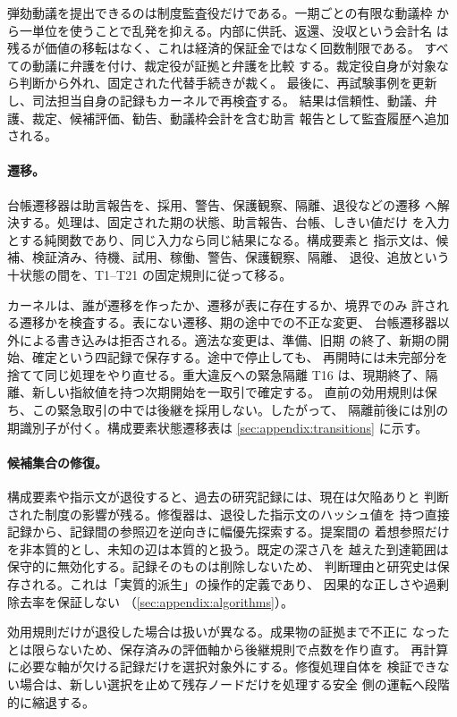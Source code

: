 弾劾動議を提出できるのは制度監査役だけである。一期ごとの有限な動議枠
から一単位を使うことで乱発を抑える。内部に供託、返還、没収という会計名
は残るが価値の移転はなく、これは経済的保証金ではなく回数制限である。
すべての動議に弁護を付け、裁定役が証拠と弁護を比較
する。裁定役自身が対象なら判断から外れ、固定された代替手続きが裁く。
最後に、再試験事例を更新し、司法担当自身の記録もカーネルで再検査する。
結果は信頼性、動議、弁護、裁定、候補評価、勧告、動議枠会計を含む助言
報告として監査履歴へ追加される。

\paragraph{遷移。}
台帳遷移器は助言報告を、採用、警告、保護観察、隔離、退役などの遷移
へ解決する。処理は、固定された期の状態、助言報告、台帳、しきい値だけ
を入力とする純関数であり、同じ入力なら同じ結果になる。構成要素と
指示文は、候補、検証済み、待機、試用、稼働、警告、保護観察、隔離、
退役、追放という十状態の間を、T1--T21 の固定規則に従って移る。

カーネルは、誰が遷移を作ったか、遷移が表に存在するか、境界でのみ
許される遷移かを検査する。表にない遷移、期の途中での不正な変更、
台帳遷移器以外による書き込みは拒否される。適法な変更は、準備、旧期
の終了、新期の開始、確定という四記録で保存する。途中で停止しても、
再開時には未完部分を捨てて同じ処理をやり直せる。重大違反への緊急隔離
T16 は、現期終了、隔離、新しい指紋値を持つ次期開始を一取引で確定する。
直前の効用規則は保ち、この緊急取引の中では後継を採用しない。したがって、
隔離前後には別の期識別子が付く。構成要素状態遷移表は
\cref{sec:appendix:transitions} に示す。

\paragraph{候補集合の修復。}
構成要素や指示文が退役すると、過去の研究記録には、現在は欠陥ありと
判断された制度の影響が残る。修復器は、退役した指示文のハッシュ値を
持つ直接記録から、記録間の参照辺を逆向きに幅優先探索する。提案間の
着想参照だけを非本質的とし、未知の辺は本質的と扱う。既定の深さ八を
越えた到達範囲は保守的に無効化する。記録そのものは削除しないため、
判断理由と研究史は保存される。これは「実質的派生」の操作的定義であり、
因果的な正しさや過剰除去率を保証しない
（\cref{sec:appendix:algorithms}）。

効用規則だけが退役した場合は扱いが異なる。成果物の証拠まで不正に
なったとは限らないため、保存済みの評価軸から後継規則で点数を作り直す。
再計算に必要な軸が欠ける記録だけを選択対象外にする。修復処理自体を
検証できない場合は、新しい選択を止めて残存ノードだけを処理する安全
側の運転へ段階的に縮退する。

